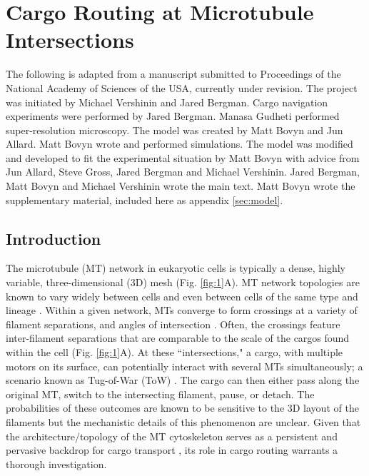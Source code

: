 \chapter{Cargo Routing at Microtubule Intersections}

The following is adapted from a manuscript submitted to Proceedings of the National Academy of Sciences of the USA, currently under revision. The project was initiated by Michael Vershinin and Jared Bergman. Cargo navigation experiments were performed by Jared Bergman. Manasa Gudheti performed super-resolution microscopy. The model was created by Matt Bovyn and Jun Allard. Matt Bovyn wrote and performed simulations. The model was modified and developed to fit the experimental situation by Matt Bovyn with advice from Jun Allard, Steve Gross, Jared Bergman and Michael Vershinin. Jared Bergman, Matt Bovyn and Michael Vershinin wrote the main text. Matt Bovyn wrote the supplementary material, included here as appendix \ref{sec:model}.

\section{Introduction}

The microtubule (MT) network in eukaryotic cells is typically a dense, highly variable, three-dimensional (3D) mesh (Fig. \ref{fig:1}A). MT network topologies are known to vary widely between cells \cite{Schnorrenberg2016} and even between cells of the same type and lineage \cite{Dong2015}. Within a given network, MTs converge to form crossings at a variety of filament separations, and angles of intersection \cite{Huang2008}. Often, the crossings feature inter-filament separations that are comparable to the scale of the cargos found within the cell (Fig. \ref{fig:1}A). At these ``intersections," a cargo, with multiple motors on its surface, can potentially interact with several MTs simultaneously; a scenario known as Tug-of-War (ToW) \cite{Muller2008,Osunbayo2015}. The cargo can then either pass along the original MT, switch to the intersecting filament, pause, or detach. The probabilities of these outcomes are known to be sensitive to the 3D layout of the filaments \cite{Balint2013,Ross2008,Erickson2013} but the mechanistic details of this phenomenon are unclear. Given that the architecture/topology of the MT cytoskeleton serves as a persistent and pervasive backdrop for cargo transport \cite{Verdeny-Vilanova2017}, its role in cargo routing warrants a thorough investigation.

